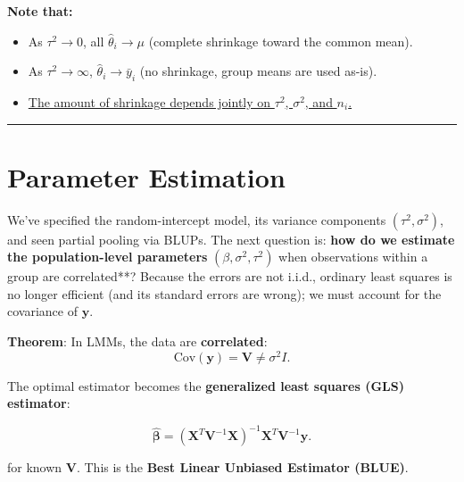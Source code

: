 \documentclass[
  letterpaper,
  DIV=11,
  numbers=noendperiod]{scrreprt}
\providecommand{\tightlist}{%
  \setlength{\itemsep}{0pt}\setlength{\parskip}{0pt}}\usepackage{longtable,booktabs,array}
\begin{document}
\textbf{Note that:}

\begin{itemize}
\tightlist
\item
  As \(\tau^2 \to 0\), all \(\hat{\theta}_i \to \mu\) (complete
  shrinkage toward the common mean).
\item
  As \(\tau^2 \to \infty\), \(\hat{\theta}_i \to \bar{y}_i\) (no
  shrinkage, group means are used as-is).
\item
  \ul{The amount of shrinkage depends jointly on \(\tau^2\),
  \(\sigma^2\), and \(n_i\).}
\end{itemize}

\begin{center}\rule{0.5\linewidth}{0.5pt}\end{center}

\hypertarget{parameter-estimation}{%
\section*{Parameter Estimation}\label{parameter-estimation}}


We've specified the random-intercept model, its variance components
\((\tau^2,\sigma^2)\), and seen partial pooling via BLUPs. The next
question is: \textbf{how do we estimate the population-level parameters}
\((\beta, \sigma^2, \tau^2)\) when observations within a group are
correlated**? Because the errors are not i.i.d., ordinary least squares
is no longer efficient (and its standard errors are wrong); we must
account for the covariance of \(\mathbf{y}\).

\begin{tcolorbox}[enhanced jigsaw, rightrule=.15mm, breakable, left=2mm, colframe=quarto-callout-note-color-frame, opacityback=0, leftrule=.75mm, toprule=.15mm, colback=white, arc=.35mm, bottomrule=.15mm]

\textbf{Theorem}: In LMMs, the data are \textbf{correlated}: \[
\text{Cov}(\mathbf{y}) = \mathbf{V} \neq \sigma^2 I.
\]

The optimal estimator becomes the \textbf{generalized least squares
(GLS) estimator}:

\[
\hat{\boldsymbol{\beta}} = (\mathbf{X}^T \mathbf{V}^{-1} \mathbf{X})^{-1} \mathbf{X}^T \mathbf{V}^{-1} \mathbf{y}.
\]

for known \(\mathbf{V}\). This is the \textbf{Best Linear Unbiased
Estimator (BLUE)}.

\end{tcolorbox}
\end{document}
